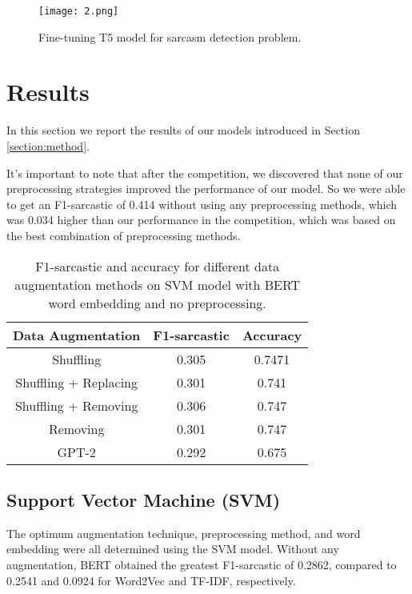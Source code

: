 \documentclass[11pt]{article}
\begin{document}
\begin{figure}
  \centering
  \texttt{[image: 2.png]}
  \caption{Fine-tuning T5 model for sarcasm detection problem.}
  \label{fig:T5}
\end{figure}

\section{Results}
\label{section:result}
In this section we report the results of our models introduced in Section \ref{section:method}.

It's important to note that after the competition, we discovered that none of our preprocessing strategies improved the performance of our model. So we were able to get an F1-sarcastic of 0.414 without using any preprocessing methods, which was 0.034 higher than our performance in the competition, which was based on the best combination of preprocessing methods.

\begin{table}
  \caption{F1-sarcastic and accuracy for different data augmentation methods on SVM model with BERT word embedding and no preprocessing.}
  \label{table: AugRes}
  \begin{center}
  \small
  \begin{tabular}{ccc}
    \toprule
    Data Augmentation & F1-sarcastic & Accuracy\\
    \midrule
    Shuffling & 0.305 & 0.7471\\
    \hline
    Shuffling + Replacing & 0.301 & 0.741\\
    \hline
    Shuffling + Removing & 0.306 & 0.747\\
    \hline
    Removing & 0.301 & 0.747\\
    \hline
    GPT-2 & 0.292 & 0.675\\
    \bottomrule
  \end{tabular}
  \end{center}
\end{table}

\subsection{Support Vector Machine (SVM)}
The optimum augmentation technique, preprocessing method, and word embedding were all determined using the SVM model. Without any augmentation, BERT obtained the greatest F1-sarcastic of 0.2862, compared to 0.2541 and 0.0924 for Word2Vec and TF-IDF, respectively.
\end{document}
